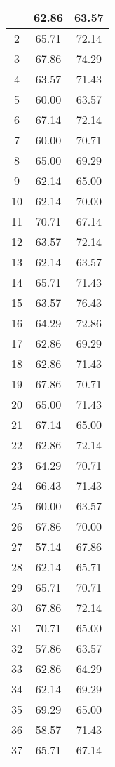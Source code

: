 \documentclass[11pt]{article}
\begin{document}
\begin{longtable}[c]{| c | c |c |}
 \hline
 \hline\hline
 \endlastfoot 
1 & 62.86 & 63.57 \\ \hline
2 & 65.71 & 72.14 \\ \hline
3 & 67.86 & 74.29 \\ \hline
4 & 63.57 & 71.43 \\ \hline
5 & 60.00 & 63.57 \\ \hline
6 & 67.14 & 72.14 \\ \hline
7 & 60.00 & 70.71 \\ \hline
8 & 65.00 & 69.29 \\ \hline
9 & 62.14 & 65.00 \\ \hline
10 & 62.14 & 70.00 \\ \hline
11 & 70.71 & 67.14 \\ \hline
12 & 63.57 & 72.14 \\ \hline
13 & 62.14 & 63.57 \\ \hline
14 & 65.71 & 71.43 \\ \hline
15 & 63.57 & 76.43 \\ \hline
16 & 64.29 & 72.86 \\ \hline
17 & 62.86 & 69.29 \\ \hline
18 & 62.86 & 71.43 \\ \hline
19 & 67.86 & 70.71 \\ \hline
20 & 65.00 & 71.43 \\ \hline
21 & 67.14 & 65.00 \\ \hline
22 & 62.86 & 72.14 \\ \hline
23 & 64.29 & 70.71 \\ \hline
24 & 66.43 & 71.43 \\ \hline
25 & 60.00 & 63.57 \\ \hline
26 & 67.86 & 70.00 \\ \hline
27 & 57.14 & 67.86 \\ \hline
28 & 62.14 & 65.71 \\ \hline
29 & 65.71 & 70.71 \\ \hline
30 & 67.86 & 72.14 \\ \hline
31 & 70.71 & 65.00 \\ \hline
32 & 57.86 & 63.57 \\ \hline
33 & 62.86 & 64.29 \\ \hline
34 & 62.14 & 69.29 \\ \hline
35 & 69.29 & 65.00 \\ \hline
36 & 58.57 & 71.43 \\ \hline
37 & 65.71 & 67.14 \\ \hline

\end{longtable}
\end{document}
